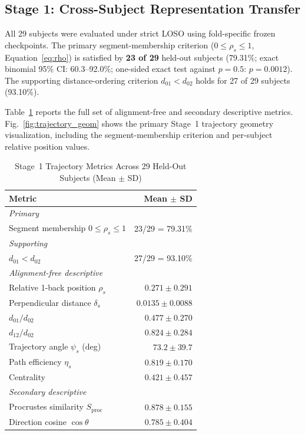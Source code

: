 \documentclass{ieeeaccess}
\begin{document}
\subsection{Stage 1: Cross-Subject Representation Transfer}

All 29 subjects were evaluated under strict LOSO using fold-specific frozen
checkpoints. The primary segment-membership criterion ($0\leq\rho_s\leq1$,
Equation~\ref{eq:rho}) is satisfied by \textbf{23 of 29} held-out subjects
(79.31\%; exact binomial 95\% CI: 60.3--92.0\%; one-sided exact test against
$p=0.5$: $p=0.0012$). The supporting distance-ordering criterion $d_{01}<d_{02}$
holds for 27 of 29 subjects (93.10\%).

Table~\ref{tab:stage1} reports the full set of alignment-free and secondary
descriptive metrics. Fig.~\ref{fig:trajectory_geom} shows the primary
Stage~1 trajectory geometry visualization, including the segment-membership
criterion and per-subject relative position values.

\begin{table}[!t]
  \caption{Stage~1 Trajectory Metrics Across 29 Held-Out Subjects (Mean $\pm$ SD)}
  \label{tab:stage1}
  \centering
  \begin{tabular}{lr}
    \toprule
    \textbf{Metric} & \textbf{Mean $\pm$ SD} \\
    \midrule
    \multicolumn{2}{l}{\emph{Primary}} \\
    Segment membership $0{\leq}\rho_s{\leq}1$ & 23/29 = 79.31\% \\
    \midrule
    \multicolumn{2}{l}{\emph{Supporting}} \\
    $d_{01}<d_{02}$                   & 27/29 = 93.10\% \\
    \midrule
    \multicolumn{2}{l}{\emph{Alignment-free descriptive}} \\
    Relative 1-back position $\rho_s$ & $0.271 \pm 0.291$ \\
    Perpendicular distance $\delta_s$ & $0.0135 \pm 0.0088$ \\
    $d_{01}/d_{02}$                   & $0.477 \pm 0.270$ \\
    $d_{12}/d_{02}$                   & $0.824 \pm 0.284$ \\
    Trajectory angle $\psi_s$ (deg)   & $73.2 \pm 39.7$ \\
    Path efficiency $\eta_s$          & $0.819 \pm 0.170$ \\
    Centrality                        & $0.421 \pm 0.457$ \\
    \midrule
    \multicolumn{2}{l}{\emph{Secondary descriptive}} \\
    Procrustes similarity $S_{\mathrm{proc}}$
                                      & $0.878 \pm 0.155$ \\
    Direction cosine $\cos\theta$     & $0.785 \pm 0.404$ \\
    \bottomrule
  \end{tabular}
\end{table}
\end{document}
